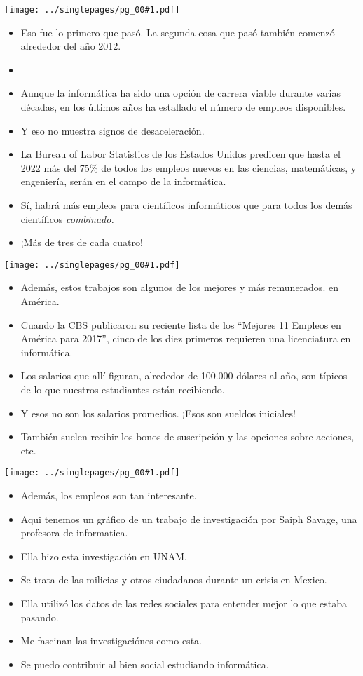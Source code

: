 \documentclass[12pt]{article}
\newcommand{\bi}{\begin{itemize}}
\newcommand{\ei}{\end{itemize}}
\newcommand{\cue}{\mbox{}
  \fbox{\sf Next slide}
}
\newcommand{\fig}[1]{
  \newpage  
  \begin{center}
    \texttt{[image: ../singlepages/pg\_00\#1.pdf]}
  \end{center}
  
}
\begin{document}
\fig{09}

\bi
\item Eso fue lo primero que pasó.
La segunda cosa que pasó también comenzó
  alrededor del año 2012.
\item \cue
\item
  Aunque la informática ha sido una opción
de carrera viable durante varias décadas, en los últimos años ha
estallado el número de empleos disponibles.
\item Y eso no muestra signos
  de desaceleración.
\item La Bureau of Labor Statistics de los Estados
Unidos predicen que hasta el 2022 más del 75\% de todos los empleos
nuevos en las ciencias, matemáticas, y engeniería, serán en el campo
de la informática.
\item
  Sí, habrá más empleos para científicos
informáticos que para todos los demás científicos {\em combinado.}

\item ¡Más de tres de cada cuatro!

\ei
\fig{10}

\bi
\item
  Además, estos trabajos son algunos de los mejores y más remunerados.
  en América.
\item Cuando la CBS publicaron su reciente lista de los
``Mejores 11 Empleos en América para 2017'', cinco de los diez
primeros requieren una licenciatura en informática. 
\item
 Los salarios que
allí figuran, alrededor de 100.000 dólares al año, son típicos de lo
que nuestros estudiantes están recibiendo.
\item
Y esos no son los salarios promedios.  ¡Esos son sueldos iniciales!
\item También suelen recibir los bonos de suscripción y las opciones
  sobre acciones, etc. 
\ei

\fig{11}

\bi
\item
Además, los empleos son tan interesante.
\item
Aqui tenemos un gráfico de
un trabajo de investigación por Saiph Savage, una profesora de
informatica.
\item Ella hizo esta investigación en UNAM.
\item
Se trata de las milicias y otros ciudadanos durante un
crisis en Mexico.
\item
  Ella utilizó los datos de las redes sociales para entender
  mejor lo que estaba pasando.
\item Me fascinan las investigaciónes como esta.
\item Se puedo contribuir al bien social estudiando informática.
\ei
\end{document}
